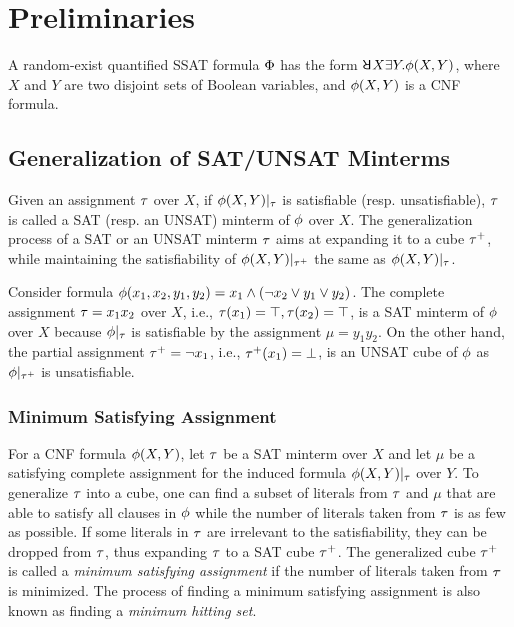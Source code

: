 \section{Preliminaries}
\label{sect:ressat-preliminaries}

A random-exist quantified SSAT formula $\Phi$ has the form $\random{} X \exists Y.\pf(X,Y)$,
where $X$ and $Y$ are two disjoint sets of Boolean variables,
and $\phi(X,Y)$ is a CNF formula.

\subsection{Generalization of SAT/UNSAT Minterms}
\label{sect:ressat-generalize}

Given an assignment $\tau$ over $X$,
if $\phi(X,Y)|_{\tau}$ is satisfiable (resp. unsatisfiable),
$\tau$ is called a SAT (resp. an UNSAT) minterm of $\phi$ over $X$.
The generalization process of a SAT or an UNSAT minterm $\tau$ aims at expanding it to a cube $\tau^+$,
while maintaining the satisfiability of $\phi(X,Y)|_{\tau^+}$ the same as $\phi(X,Y)|_{\tau}$.
\begin{example}
    \label{ex:ressat-assign}
    Consider formula $\phi(x_1,x_2,y_1,y_2)=x_1 \land (\lnot x_2 \lor y_1 \lor y_2)$.
    The complete assignment $\tau = x_1 x_2$ over $X$, i.e., $\tau(x_1)=\top, \tau(x_2)=\top$,
    is a SAT minterm of $\phi$ over $X$ because $\phi|_{\tau}$ is satisfiable by the assignment $\mu = y_1y_2$.
    On the other hand, the partial assignment $\tau^+ = \lnot x_1$, i.e., $\tau^+(x_1)=\bot$,
    is an UNSAT cube of $\phi$ as $\phi|_{\tau^+}$ is unsatisfiable.
\end{example}

\subsubsection{Minimum Satisfying Assignment}
For a CNF formula $\phi(X,Y)$,
let $\tau$ be a SAT minterm over $X$ and let $\mu$ be a satisfying complete assignment for the induced formula $\phi(X,Y)|_{\tau}$ over $Y$.
To generalize $\tau$ into a cube, one can find a subset of literals from $\tau$ and $\mu$ that are able to satisfy all clauses in $\phi$ while the number of literals taken from $\tau$ is as few as possible.
If some literals in $\tau$ are irrelevant to the satisfiability,
they can be dropped from $\tau$, thus expanding $\tau$ to a SAT cube $\tau^+$.
The generalized cube $\tau^+$ is called a \textit{minimum satisfying assignment} if the number of literals taken from $\tau$ is minimized.
The process of finding a minimum satisfying assignment is also known as finding a \textit{minimum hitting set}.

